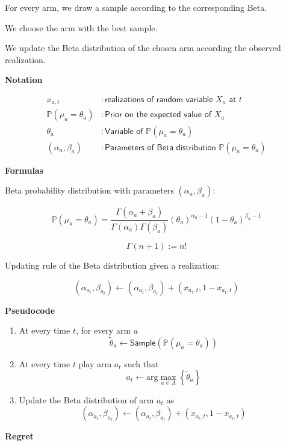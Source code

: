 \documentclass[10pt,a4paper]{article}
\begin{document}
For every arm, we draw a sample according to the corresponding Beta.

We choose the arm with the best sample.

We update the Beta distribution of the chosen arm according the observed realization.
\newline

\textbf{Notation}

$$\begin{aligned}
x_{a,t} &: \textsf{realizations of random variable } X_a \textsf{ at } t\\
\mathbb{P}(\mu_a = \theta_a) &: \textsf{Prior on the expected value of } X_a \\
\theta_a &: \textsf{Variable of } \mathbb{P}(\mu_a = \theta_a) \\
(\alpha_a, \beta_a) &: \textsf{Parameters of Beta distribution } \mathbb{P}(\mu_a = \theta_a)
\end{aligned}$$
\newline

\textbf{Formulas}

Beta probability distribution with parameters $(\alpha_a, \beta_a)$:

$$\mathbb{P}\left(\mu_{a}=\theta_{a}\right)=\frac{\Gamma\left(\alpha_{a}+\beta_{a}\right)}{\Gamma\left(\alpha_{a}\right) \Gamma\left(\beta_{a}\right)}\left(\theta_{a}\right)^{\alpha_{a}-1}\left(1-\theta_{a}\right)^{\beta_{a}-1}$$

$$\Gamma(n+1) := n!$$

Updating rule of the Beta distribution given a realization:

$$(\alpha_{a_t}, \beta_{a_t}) \leftarrow (\alpha_{a_t}, \beta_{a_t}) + (x_{a_t, t}, 1 - x_{a_t, t})$$
\newline

\textbf{Pseudocode}

\begin{enumerate}
\item At every time $t$, for every arm $a$
$$\tilde{\theta}_a \leftarrow \mathsf{Sample}(\mathbb{P}(\mu_a = \theta_a))$$
\item At every time $t$ play arm $a_t$ such that
$$a_t \leftarrow \text{arg} \max_{a \in A} \left\{ \tilde{\theta}_a \right\}$$
\item Update the Beta distribution of arm $a_t$ as
$$(\alpha_{a_t}, \beta_{a_t}) \leftarrow (\alpha_{a_t}, \beta_{a_t}) + (x_{a_t, t}, 1 - x_{a_t, t})$$
\end{enumerate}

\textbf{Regret}
\end{document}

